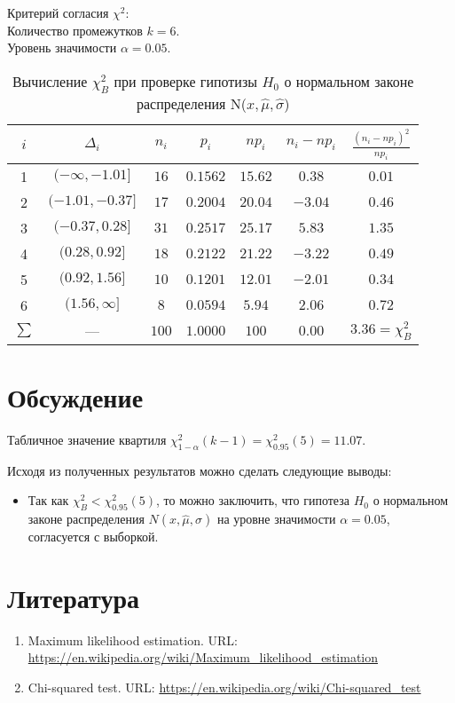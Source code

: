 \documentclass[12pt,a4paper]{article}
\begin{document}
		Критерий согласия $\chi^2$:\\
		Количество промежутков $k = 6$.\\
		Уровень значимости $\alpha = 0.05$.
		\begin{table}[H]
			\begin{center}
				\begin{tabular}{|c|c|c|c|c|c|c|}
					\hline
					$i$ & $\Delta_i$          &   $n_i$ &   $p_i$ &   $np_i$ &   $n_i-np_i$ &   $\frac{(n_i-np_i)^2}{np_i}$ \\
					\hline
					   1   & $(-\infty, -1.01]$ & $16$  & $0.1562$ & $15.62$ & $0.38$  & $0.01$ \\
					   2   & $(-1.01, -0.37]$   & $17$  & $0.2004$ & $20.04$ & $-3.04$ & $0.46$ \\
					   3   & $(-0.37, 0.28]$    & $31$  & $0.2517$ & $25.17$ & $5.83$  & $1.35$ \\
					   4   & $(0.28, 0.92]$     & $18$  & $0.2122$ & $21.22$ & $-3.22$ & $0.49$ \\
					   5   & $(0.92, 1.56]$     & $10$  & $0.1201$ & $12.01$ & $-2.01$ & $0.34$ \\
					   6   & $(1.56, \infty]$   & $8$   & $0.0594$ & $5.94$  & $2.06$  & $0.72$ \\
					$\sum$ & ---                & $100$ & $1.0000$ & $100$   & $0.00$  & $3.36 = \chi^2_B$ \\
					\hline
				\end{tabular}
			\end{center}
			\caption{Вычисление $\chi^2_B$ при проверке гипотизы $H_0$ о нормальном законе распределения N($x, \hat{\mu}, \hat{\sigma}$)}
		\end{table}

	\section{Обсуждение}
	Табличное значение квартиля $\chi^2_{1 - \alpha}(k - 1) = \chi^2_{0.95}(5) = 11.07$.
	
	Исходя из полученных результатов можно сделать следующие выводы:
	\begin{itemize}
		\item Так как $\chi^2_B < \chi^2_{0.95}(5)$, то можно заключить, что гипотеза $H_0$ о нормальном законе распределения $N(x, \hat{\mu}, \hat{\sigma})$ на уровне значимости $\alpha = 0.05$, согласуется с выборкой.
	\end{itemize}
	
	\section{Литература}
	\begin{enumerate}		
		\item Maximum likelihood estimation. URL: \url{https://en.wikipedia.org/wiki/Maximum_likelihood_estimation}
		
		\item Chi-squared test. URL: \url{https://en.wikipedia.org/wiki/Chi-squared_test}
	\end{enumerate}
\end{document}
